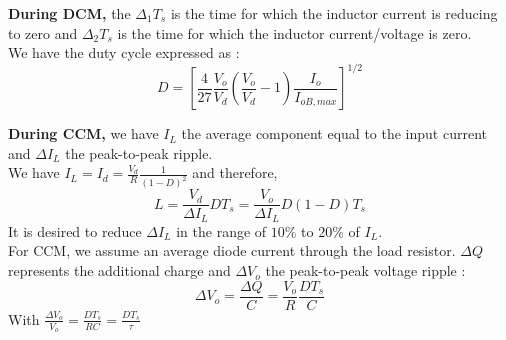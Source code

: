 \documentclass[../main.tex]{subfiles}
\begin{document}
\textbf{During DCM,} the $\Delta_1 T_s$ is the time for which the inductor current is reducing to zero and $\Delta_2 T_s$ is the time for which the inductor current/voltage is zero. \\
We have the duty cycle expressed as : \begin{equation}
    D = [\frac{4}{27} \frac{V_o}{V_d} (\frac{V_o}{V_d} -1 ) \frac{I_o}{I_{oB, max}}]^{1/2}
\end{equation}

\textbf{During CCM,} we have $I_L$ the average component equal to the input current and $\Delta I_L$ the peak-to-peak ripple.\\
We have $I_L = I_d = \frac{V_d}{R} \frac{1}{(1-D)^2}$ and therefore, \begin{equation}
L = \frac{V_d}{\Delta I_L} DT_s = \frac{V_o}{\Delta I_L} D(1-D) T_s\end{equation}
\warning It is desired to reduce $\Delta I_L$ in the range of $10\%$ to $20\%$ of $I_L$.\\

For CCM, we assume an average diode current through the load resistor. $\Delta Q$ represents the additional charge and $\Delta V_o$ the peak-to-peak voltage ripple : \begin{equation}\Delta V_o = \frac{\Delta Q}{C} = \frac{V_o}{R} \frac{D T_s}{C}\end{equation}
With $\frac{\Delta V_o}{V_o} = \frac{D T_s}{RC} = \frac{DT_s}{\tau}$\\
\end{document}
